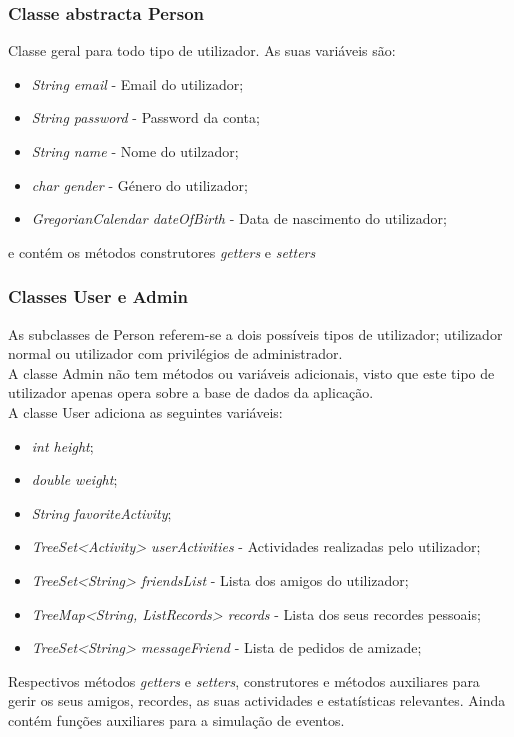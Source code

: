 \documentclass[10pt,notitlepage]{article}
\begin{document}
\subsubsection{Classe abstracta Person}
Classe geral para todo tipo de utilizador. As suas variáveis são:
\begin{itemize}
\item \textit{String email} - Email do utilizador;
\item \textit{String password} - Password da conta;
\item \textit{String name} - Nome do utilzador;
\item \textit{char gender} - Género do utilizador;
\item \textit{GregorianCalendar dateOfBirth} - Data de nascimento do utilizador;
\end{itemize}
e contém os métodos construtores \textit{getters} e \textit{setters}

\subsubsection{Classes User e Admin}

As subclasses de Person referem-se a dois possíveis tipos de utilizador; utilizador normal ou utilizador com privilégios de administrador.\\
A classe Admin não tem métodos ou variáveis adicionais, visto que este tipo de utilizador apenas opera sobre a base de dados da aplicação.\\
A classe User adiciona as seguintes variáveis:
\begin{itemize}
\item \textit{int height};
\item \textit{double weight};
\item \textit{String favoriteActivity};
\item \textit{TreeSet<Activity> userActivities} - Actividades realizadas pelo utilizador;
\item \textit{TreeSet<String> friendsList} - Lista dos amigos do utilizador;
\item \textit{TreeMap<String, ListRecords> records} - Lista dos seus recordes pessoais;
\item \textit{TreeSet<String> messageFriend} - Lista de pedidos de amizade;
\end{itemize}
Respectivos métodos \textit{getters} e \textit{setters}, construtores e métodos auxiliares para gerir os seus amigos, recordes, as suas actividades e estatísticas relevantes. Ainda contém funções auxiliares para a simulação de eventos.
\end{document}
